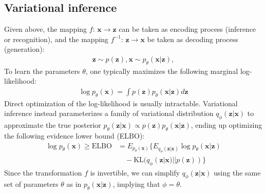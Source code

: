 \documentclass[conference]{IEEEtran}
\begin{document}
\subsection{Variational inference}
Given above, the mapping $f$: $\mathbf{x} \xrightarrow{} \mathbf{z}$ can be taken as encoding process (inference or recognition), and the mapping $f^{-1}$: $\mathbf{z} \xrightarrow{} \mathbf{x}$ be taken as decoding process (generation):
\begin{align}
    \mathbf{z} \sim p(\mathbf{z}), \mathbf{x} \sim p_\theta(\mathbf{x}|\mathbf{z}),
\end{align}
To learn the parameters $\theta$, one typically maximizes the following marginal log-likelihood:
\begin{align}
    \log p_\theta(\mathbf{x}) = \int p(\mathbf{z})  p_\theta(\mathbf{x}|\mathbf{z})d\mathbf{z}
\end{align}
Direct optimization of the log-likelihood is usually intractable. Variational inference instead parameterizes a family of variational distribution $q_\phi(\mathbf{z}|\mathbf{x})$ to approximate the true posterior $p_\theta(\mathbf{z}|\mathbf{x}) \varpropto  p(\mathbf{z})  p_\theta(\mathbf{x}|\mathbf{z})$, ending up optimizing the following evidence lower bound (ELBO): 
\begin{align}\label{eq:vi_elbo}
    \log p_\theta(\mathbf{x}) \geqslant \text{ELBO} &= E_{p_\theta(\mathbf{x})} 
     \{E_{q_\phi(\mathbf{z}|\mathbf{x})} \log p_\theta(\mathbf{x}|\mathbf{z}) \nonumber\\
    &\quad - \text{KL}(q_\phi(\mathbf{z}|\mathbf{x})||p(\mathbf{z}))\}
\end{align}
Since the transformation $f$ is invertible, we can simplify $q_\phi(\mathbf{z}|\mathbf{x})$ using the same set of parameters $\theta$ as in $p_\theta(\mathbf{x}|\mathbf{z})$, implying that $\phi=\theta$.
\end{document}
